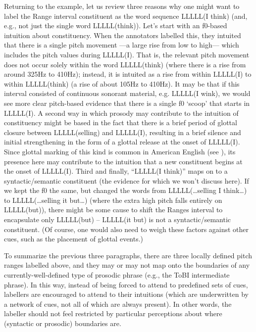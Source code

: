 \documentclass[11pt, twoside]{memoir}
\begin{document}
Returning to the example, let us review three reasons why one might want to label the Range interval constituent as the word sequence LLLLL(I think) (and, e.g., not just the single word LLLLL(think)). Let’s start with an f0-based intuition about constituency. When the annotators labelled this, they intuited that there is a single pitch movement —a large rise from low to high— which includes the pitch values during LLLLL(I). That is, the relevant pitch movement does not occur solely within the word LLLLL(think) (where there is a rise from around 325Hz to 410Hz); instead, it is intuited as a rise from within LLLLL(I) to within LLLLL(think) (a rise of about 105Hz to 410Hz). It may be that if this interval consisted of continuous sonorant material, e.g. LLLLL(I wink), we would see more clear pitch-based evidence that there is a single f0 ‘scoop’ that starts in LLLLL(I). A second way in which prosody may contribute to the intuition of constituency might be based in the fact that there is a brief period of glottal closure between LLLLL(selling) and LLLLL(I), resulting in a brief silence and initial strengthening in the form of a glottal release at the onset of LLLLL(I). Since glottal marking of this kind is common in American English (see \citealt{dilley-96}), its presence here may contribute to the intuition that a new constituent begins at the onset of LLLLL(I). Third and finally, “LLLLL(I think)” maps on to a syntactic\slash semantic constituent (the evidence for which we won’t discuss here). If we kept the f0 the same, but changed the words from LLLLL(…selling I think…) to LLLLL(…selling it but…) (where the extra high pitch falls entirely on LLLLL(but)), there might be some cause to shift the Ranges interval to encapsulate only LLLLL(but) – LLLLL(it but) is not a syntactic\slash semantic constituent. (Of course, one would also need to weigh these factors against other cues, such as the placement of glottal events.)

To summarize the previous three paragraphs, there are three locally defined pitch ranges labelled above, and they may or may not map onto the boundaries of any currently-well-defined type of prosodic phrase (e.g., the ToBI intermediate phrase). In this way, instead of being forced to attend to predefined sets of cues, labellers are encouraged to attend to their intuitions (which are underwritten by a network of cues, not all of which are always present). In other words, the labeller should not feel restricted by particular perceptions about where (syntactic or prosodic) boundaries are.
\end{document}
